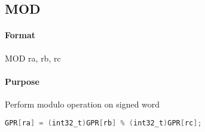 \subsection{MOD}


\paragraph{Format} MOD ra, rb, rc

\paragraph{Purpose} Perform modulo operation on signed word

\begin{lstlisting}[language=C]
    GPR[ra] = (int32_t)GPR[rb] % (int32_t)GPR[rc];
\end{lstlisting}
